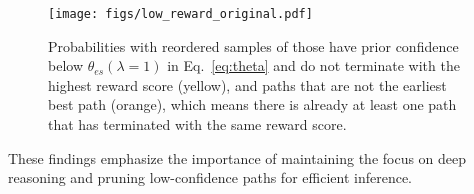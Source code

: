 

\jwt{


}

\begin{figure}[t]
    \texttt{[image: figs/low\_reward\_original.pdf]}
    \vspace{-0.1in}
    \caption{Probabilities with reordered samples of those have prior confidence below $\theta_{es}(\lambda=1)$ in Eq.~\ref{eq:theta} and do not terminate with the highest reward score (yellow), and paths that are not the earliest best path (orange), which means there is already at least one path that has terminated with the same reward score. }
    \vspace{-0.2in}
    \label{fig:motivation_low_confidence}
\end{figure}

These findings emphasize the importance of maintaining the focus on deep reasoning and pruning low-confidence paths for efficient inference. 

